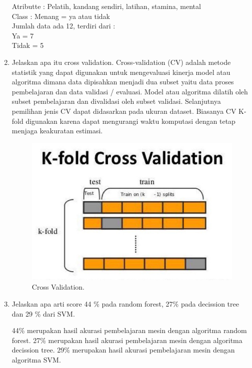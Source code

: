 \begin{enumerate}
	Atributte : Pelatih, kandang sendiri, latihan, stamina, mental\\
	Class     : Menang = ya atau tidak\\
	Jumlah data ada 12, terdiri dari :\\
	Ya       = 7\\
	Tidak    = 5\\
	
	\item Jelaskan apa itu cross validation.
	\hfill\break
	Cross-validation (CV) adalah metode statistik yang dapat digunakan untuk mengevaluasi kinerja model atau algoritma dimana data dipisahkan menjadi dua subset yaitu data proses pembelajaran dan data validasi / evaluasi. Model atau algoritma dilatih oleh subset pembelajaran dan divalidasi oleh subset validasi. Selanjutnya pemilihan jenis CV dapat didasarkan pada ukuran dataset. Biasanya CV K-fold digunakan karena dapat mengurangi waktu komputasi dengan tetap menjaga keakuratan estimasi.

	\begin{figure}[H]
		\centering
		\includegraphics[width=8 cm]{figures/1174006/chapter3/soalteori/3.jpg}
		\caption{Cross Validation.}
	\end{figure}

	\item Jelaskan apa arti score 44 \% pada random forest, 27\% pada decission tree dan 29 \% dari SVM.
	\hfill\break

	44\% merupakan hasil akurasi pembelajaran mesin dengan algoritma random forest. 27\% merupakan hasil akurasi pembelajaran mesin dengan algoritma decission tree. 29\% merupakan hasil akurasi pembelajaran mesin dengan algoritma SVM.


\end{enumerate}
